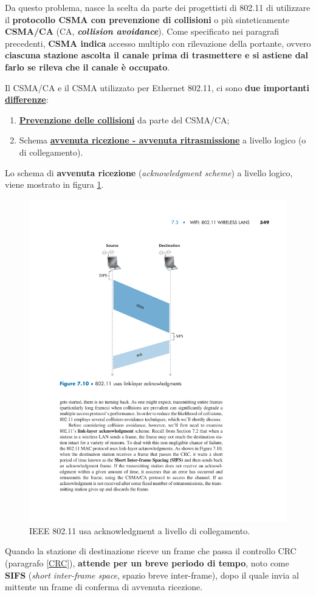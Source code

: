 \documentclass[a4paper]{article}
\begin{document}
	\noindent
	Da questo problema, nasce la scelta da parte dei progettisti di 802.11 di utilizzare il \textcolor{Red3}{\textbf{protocollo CSMA con prevenzione di collisioni}} o più sinteticamente \textcolor{Red3}{\textbf{CSMA/CA}} (CA, \textbf{\emph{collision avoidance}}). Come specificato nei paragrafi precedenti, \textbf{CSMA indica} accesso multiplo con rilevazione della portante, ovvero \textbf{ciascuna stazione ascolta il canale prima di trasmettere e si astiene dal farlo se rileva che il canale è occupato}.\newline

	\noindent
	Il CSMA/CA e il CSMA utilizzato per Ethernet 802.11, ci sono\textbf{ due importanti \underline{differenze}}:
	\begin{enumerate}
		\item \underline{\textbf{Prevenzione delle collisioni}} da parte del CSMA/CA;
		\item Schema \underline{\textbf{avvenuta ricezione - avvenuta ritrasmissione}} a livello logico (o di collegamento).
	\end{enumerate}
	Lo schema di \textbf{avvenuta ricezione} (\emph{acknowledgment scheme}) a livello logico, viene mostrato in figura \ref{avvenuta ricezione}.\newpage
	\begin{figure}[!htp]
		\centering
		\includegraphics[width=.5\textwidth]{img/avvenuta_ricezione.pdf}
		\caption{IEEE 802.11 usa acknowledgment a livello di collegamento.}
		\label{avvenuta ricezione}
	\end{figure}
	
	\noindent
	Quando la stazione di destinazione riceve un frame che passa il controllo CRC (paragrafo \ref{CRC}), \textbf{attende per un breve periodo di tempo}, noto come \textbf{SIFS} (\emph{short inter-frame space}, spazio breve inter-frame), dopo il quale invia al mittente un frame di conferma di avvenuta ricezione.\newline
	
\end{document}
